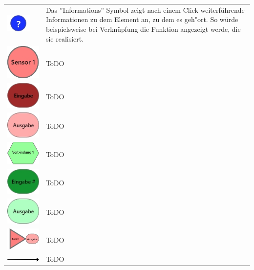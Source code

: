 \documentclass[parskip=full]{scrartcl}
\begin{document}
\begin{tabular}[t]{p{1cm} p{10cm}}
	\vspace{0cm}\includegraphics[width = 1 cm]{Grafik/Information.jpg} & Das ''Informations''-Symbol zeigt nach einem Click weiterführende Informationen zu dem Element an, zu dem es geh"ort. So würde beispielsweise bei Verknüpfung die Funktion angezeigt werde, die sie realisiert.\newline\\
	\vspace{0cm}\includegraphics[width = 1 cm]{Grafik/Sensorelement.jpg} & ToDO\\
	\vspace{0cm}\includegraphics[width = 1 cm]{Grafik/Eingabe-Sensor.jpg} & ToDO\\
	\vspace{0cm}\includegraphics[width = 1 cm]{Grafik/Ausgabe-Sensor.jpg} & ToDO\\
	\vspace{0cm}\includegraphics[width = 1 cm]{Grafik/Verbindungselement.jpg} & ToDO\\
	\vspace{0cm}\includegraphics[width = 1 cm]{Grafik/Eingabe-Verbindung.jpg} & ToDO\\
	\vspace{0cm}\includegraphics[width = 1 cm]{Grafik/Ausgabe-Verbindung.jpg} & ToDO\\
	\vspace{0cm}\includegraphics[width = 1 cm]{Grafik/Kanal.jpg} & ToDO\\
	\vspace{0cm}\includegraphics[width = 1 cm]{Grafik/Verbindungspfeil.jpg} & ToDO\\
\end{tabular}
\end{document}
